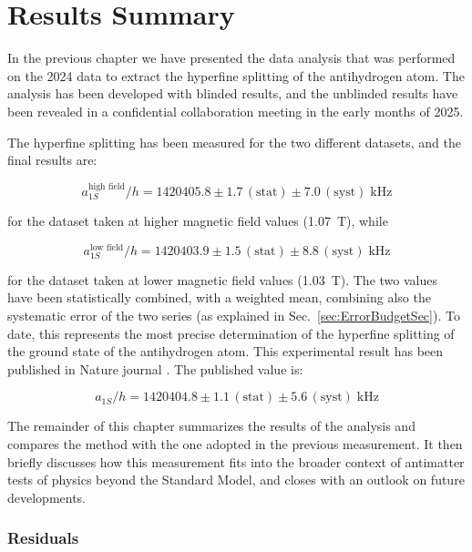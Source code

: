 \chapter{Results Summary}
\label{ch:results}

In the previous chapter we have presented the data analysis that was performed on the 2024 data to extract the hyperfine splitting of the antihydrogen atom. The analysis has been developed with blinded results, and the unblinded results have been revealed in a confidential collaboration meeting in the early months of 2025.

The hyperfine splitting has been measured for the two different datasets, and the final results are:

\begin{equation*}
a^{\text{high field}}_{1S}/h = 1420405.8 \pm 1.7\,(\text{stat}) \pm 7.0\,(\text{syst}) \; \text{kHz}
\end{equation*}

for the dataset taken at higher magnetic field values (\SI{1.07}{\tesla}), while 

\begin{equation*}
a^{\text{low field}}_{1S}/h = 1420403.9 \pm 1.5\,(\text{stat}) \pm 8.8\,(\text{syst}) \; \text{kHz}
\end{equation*}

for the dataset taken at lower magnetic field values (\SI{1.03}{\tesla}). The two values have been statistically combined, with a weighted mean, combining also the systematic error of the two series (as explained in Sec.~\ref{sec:ErrorBudgetSec}). To date, this represents the most precise determination of the hyperfine splitting of the ground state of the antihydrogen atom. This experimental result has been published in Nature journal \cite{ALPHA:2026lbu}. The published value is:

\begin{equation*}
a_{1S}/h = 1420404.8 \pm 1.1\,(\text{stat}) \pm 5.6\,(\text{syst}) \; \text{kHz}
\end{equation*}

The remainder of this chapter summarizes the results of the analysis and compares the method with the one adopted in the previous measurement. It then briefly discusses how this measurement fits into the broader context of antimatter tests of physics beyond the Standard Model, and closes with an outlook on future developments.   

\subsection{Residuals}

